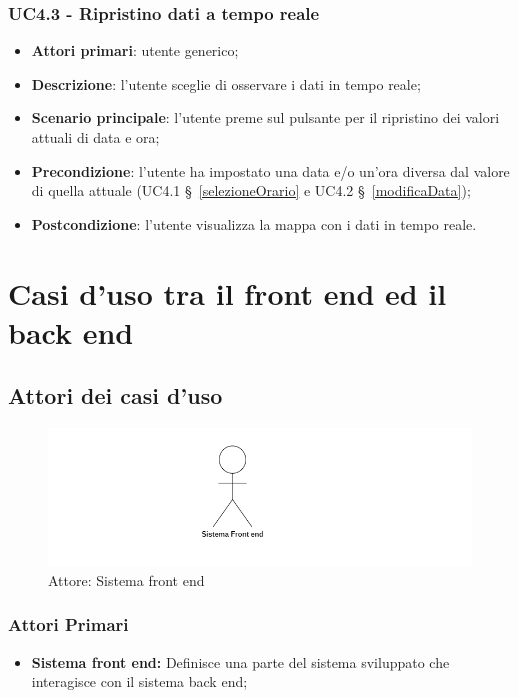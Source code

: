 \subsubsection{UC4.3 - Ripristino dati a tempo reale}\label{ripristinoTempoReale}
\begin{itemize}
	\item \textbf{Attori primari}: utente generico;
	\item \textbf{Descrizione}:  l’utente sceglie di osservare i dati in tempo reale;
	\item \textbf{Scenario principale}: l’utente preme sul pulsante per il ripristino dei valori attuali di data e ora;
	\item \textbf{Precondizione}: l’utente ha impostato una data e/o un’ora diversa dal valore di quella attuale (UC4.1 \S~\ref{selezioneOrario} e UC4.2 \S~\ref{modificaData});
	\item \textbf{Postcondizione}: l’utente visualizza la mappa con i dati in tempo reale.
\end{itemize}

\section{Casi d'uso tra il front end ed il back end}\label{ucFrontEndBackEnd}

\subsection{Attori dei casi d'uso} %
\begin{center}
	\begin{figure}[H]
		\includegraphics{../immagini/attori_casi/sistema_front_end.png}
		\caption{Attore: Sistema front end}
	\end{figure}
\end{center}
\subsubsection{Attori Primari}\label{FBattoriPrimari}
\begin{itemize}
	\item \textbf{Sistema front end:} Definisce una parte del sistema sviluppato che interagisce con il sistema back end;
\end{itemize}

